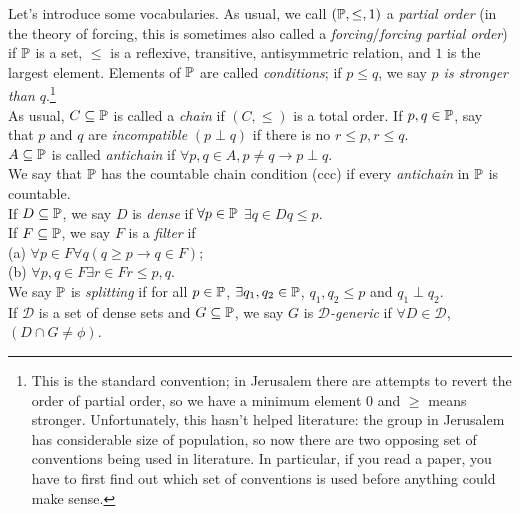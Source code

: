 \documentclass[a4paper]{article}
\begin{document}
Let's introduce some vocabularies. As usual, we call $(\P,\leq,1)$ a \emph{partial order} (in the theory of forcing, this is sometimes also called a \emph{forcing}/\emph{forcing partial order}) if $\P$ is a set, $\leq$ is a reflexive, transitive, antisymmetric relation, and $1$ is the largest element. Elements of $\P$ are called \emph{conditions}; if $p \leq q$, we say \emph{$p$ is stronger than $q$}.\footnote{This is the standard convention; in Jerusalem there are attempts to revert the order of partial order, so we have a minimum element 0 and $\geq$ means stronger. Unfortunately, this hasn't helped literature: the group in Jerusalem has considerable size of population, so now there are two opposing set of conventions being used in literature. In particular, if you read a paper, you have to first find out which set of conventions is used before anything could make sense.}\\
As usual, $C \subseteq \P$ is called a \emph{chain} if $(C,\leq)$ is a total order. If $p,q \in \P$, say that $p$ and $q$ are \emph{incompatible} $(p \perp q)$ if there is no $r \leq p, r \leq q$.\\
$A \subseteq \P$ is called \emph{antichain} if $\forall p,q \in A, p \neq q \to p \perp q$.\\
We say that $\P$ has the countable chain condition (ccc) if every \emph{antichain} in $\P$ is countable.\\
If $D \subseteq \P$, we say $D$ is \emph{dense} if $\forall p \in \P$ $\exists q \in D q \leq p$.\\
If $F \subseteq \P$, we say $F$ is a \emph{filter} if \\
(a) $\forall p \in F \forall q (q \geq p \to q \in F)$;\\
(b) $\forall p,q \in F \exists r \in F r \leq p,q$.\\
We say $\P$ is \emph{splitting} if for all $p \in \P$, $\exists q_1,q_2 \in \P$, $q_1,q_2 \leq p$ and $q_1 \perp q_2$.\\
If $\mathcal{D}$ is a set of dense sets and $G \subseteq \P$, we say $G$ is \emph{$\mathcal{D}$-generic} if $\forall D \in \mathcal{D}$, $(D \cap G \neq \phi)$.
\end{document}

